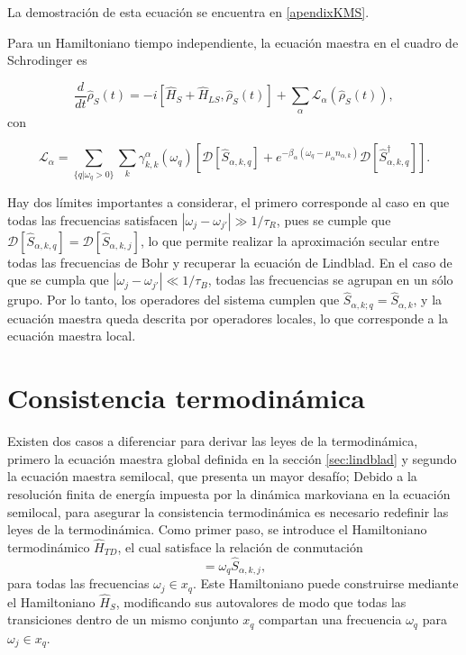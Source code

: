 La demostración de esta ecuación se encuentra en \ref{apendixKMS}.

Para un Hamiltoniano tiempo independiente, la ecuación maestra en el cuadro de Schrodinger es

\begin{equation}
    \frac{d}{dt}\hat{\rho}_{S}(t) = -i [\hat{H}_{S}+ \hat{H}_{LS},\hat{\rho}_{S}(t)] + \sum_{\alpha}\mathcal{L}_{\alpha}(\hat{\rho}_{S}(t)),
\label{sec2schrodingerthermo}
\end{equation}
con

\begin{equation}
    \mathcal{L}_{\alpha} = \sum_{\{q|\omega_{q}>0\}} \sum_{k}\gamma^{\alpha}_{k,k}(\omega_{q}) \left[ \mathcal{D}[\hat{S}_{\alpha,k,q}] + e^{-\beta_{\alpha}(\omega_{q} - \mu_{\alpha}n_{\alpha,k})}\mathcal{D}[\hat{S}^{\dagger}_{\alpha,k,q}]  \right].
\label{sec2lindbladconsistency}
\end{equation}

Hay dos límites importantes a considerar, el primero corresponde al caso en que todas las frecuencias satisfacen $|\omega_{j}-\omega_{j'}| \gg 1/\tau_{R}$, pues se cumple que $\mathcal{D}[\hat{S}_{\alpha,k,q}] = \mathcal{D}[\hat{S}_{\alpha,k,j}]$, lo que permite realizar la aproximación secular entre todas las frecuencias de Bohr y recuperar la ecuación de Lindblad. En el caso de que se cumpla que $|\omega_{j}-\omega_{j'}| \ll 1/\tau_{B}$, todas las frecuencias se agrupan en un sólo grupo. Por lo tanto, los operadores del sistema cumplen que $\hat{S}_{\alpha,k;q} = \hat{S}_{\alpha,k}$, y la ecuación maestra queda descrita por operadores locales, lo que corresponde a la ecuación maestra local\cite{wichterich2007modeling}.
\section{Consistencia termodinámica}
Existen dos casos a diferenciar para derivar las leyes de la termodinámica, primero la ecuación maestra global definida en la sección \ref{sec:lindblad} y segundo la ecuación maestra semilocal, que presenta un mayor desafío; Debido a la resolución finita de energía impuesta por la dinámica markoviana en la ecuación semilocal, para asegurar la consistencia termodinámica es necesario redefinir las leyes de la termodinámica. Como primer paso, se introduce el Hamiltoniano termodinámico $\hat{H}_{TD}$, el cual satisface la relación de conmutación
\label{sec2:thermolaws}
\begin{equation*}
    [\hat{S}_{\alpha,k,j},\hat{H}_{TD}] = \omega_{q}\hat{S}_{\alpha,k,j},
\end{equation*}
para todas las frecuencias $\omega_{j} \in x_{q}$. Este Hamiltoniano puede construirse mediante el Hamiltoniano $\hat{H}_{S}$, modificando sus autovalores de modo que todas las transiciones dentro de un mismo conjunto $x_q$ compartan una frecuencia $\omega_{q}$ para $\omega_{j} \in x_{q}$.

